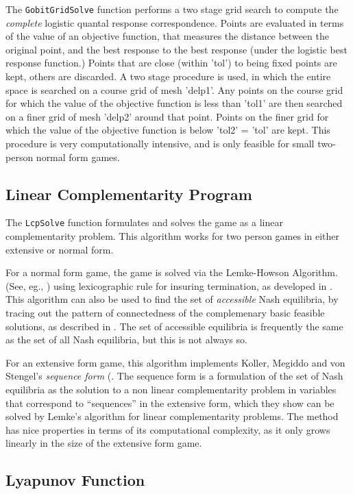 The {\tt GobitGridSolve} function performs a two stage grid search to
compute the {\em complete} logistic quantal response correspondence.
Points are evaluated in terms of the value of an objective function,
that measures the distance between the original point, and the best
response to the best response (under the logistic best response
function.)  Points that are close (within 'tol') to being fixed points
are kept, others are discarded.  A two stage procedure is used, in
which the entire space is searched on a course grid of mesh 'delp1'.
Any points on the course grid for which the value of the objective
function is less than 'tol1' are then searched on a finer grid of mesh
'delp2' around that point.  Points on the finer grid for which the
value of the objective function is below 'tol2' = 'tol' are kept.
This procedure is very computationally intensive, and is only feasible
for small two-person normal form games.

\subsection{Linear Complementarity Program}

The {\tt LcpSolve} function formulates and solves the game as a linear
complementarity problem.  This algorithm works for two person
games in either extensive or normal form.  
 
For a normal form game, the game is solved via the Lemke-Howson
Algorithm.  (See, eg.,
\cite{LemHow:64}) using lexicographic rule for insuring
termination, as developed in \cite{Eav:71}.  This algorithm can also
be used to find the set of {\em accessible} Nash equilibria, by
tracing out the pattern of connectedness of the complemenary basic
feasible solutions, as described in \cite{Sha:74}.  The set of
accessible equilibria is frequently the same as the set of all Nash
equilibria, but this is not always so.

For an extensive form game, this algorithm implements Koller, Megiddo
and von Stengel's {\em sequence form} (\cite{KolMegSte:94}. The
sequence form is a formulation of the set of Nash equilibria as the
solution to a non linear complementarity problem in variables that
correspond to ``sequences'' in the extensive form, which they show can
be solved by Lemke's algorithm for linear complementarity problems.
The method has nice properties in terms of its computational
complexity, as it only grows linearly in the size of the extensive
form game.  

\subsection{Lyapunov Function}

